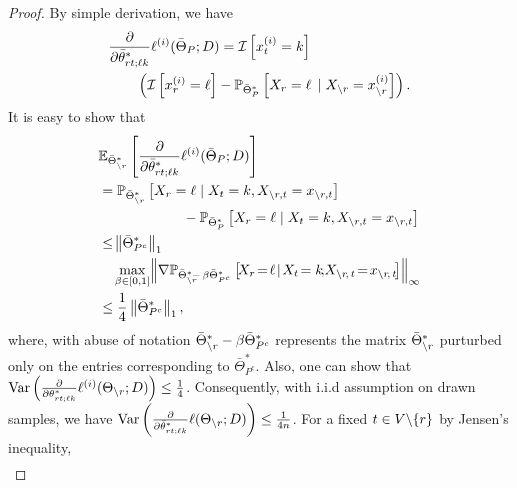 \begin{proof}
By simple derivation, we have
\begin{equation}
\begin{aligned}
&\frac{\partial}{\partial\bar{\theta}^*_{r t;\ell k}}\ell^{(i)}(\bar{\Theta}_P; D) = \mathcal{I}\left[x_t^{(i)}=k\right] \\ &\qquad\left(\mathcal{I}\left[x_{r}^{(i)}=\ell\right] - \mathbb{P}_{\bar{\Theta}^*_P} \left[X_{r} = \ell \, \mid X_{\backslash r} =
x_{\backslash r}^{(i)}\right]\right).
\end{aligned}
\nonumber
\end{equation}
It is easy to show that
\begin{equation} 
\begin{aligned}
&\mathbb{E}_{\bar{\Theta}^*_{\backslash\svert}}\left[\frac{\partial}{\partial\bar{\theta}^*_{\svert t;\ell k}}\ell^{(i)}(\bar{\Theta}_P; \Data)\right]\\ &=\mathbb{P}_{\bar{\Theta}^*_{\backslash\svert}}\left[X_\svert=\ell\mid X_t=k,X_{\backslash\svert,t}=x_{\backslash\svert,t}\right]\\ &\qquad\qquad\qquad-\mathbb{P}_{\bar{\Theta}^*_P}\left[X_\svert=\ell\mid X_t=k,X_{\backslash\svert,t}=x_{\backslash\svert,t}\right]\\
&\leq\!\norm{\bar{\Theta}^*_{P^c}}{1}\\ &\quad\max_{\beta\in[0,1]}\!\norm{\nabla\mathbb{P}_{\bar{\Theta}^*_{\backslash\svert}\!\!\!-\,\beta\bar{\Theta}^*_{P^c}} \left[\!X_\svert\!=\!\ell\!\mid\! X_t\!=k\!,\!X_{\backslash\svert\!,\,t}\!=\!x_{\backslash\svert\!,\,t}\!\right]}{\infty}\\ &\leq\frac{1}{4}\norm{\bar{\Theta}^*_{P^c}}{1},
\end{aligned}
\nonumber
\end{equation}
where, with abuse of notation $\bar{\Theta}^*_{\backslash r}-\beta\bar{\Theta}^*_{P^c}$ represents the matrix $\bar{\Theta}^*_{\backslash r}$ purturbed only on the entries corresponding to $\bar{\Theta}^*_{P^c}$. Also, one can show that $\text{Var}\left(\frac{\partial}{\partial\theta^*_{r t;\ell k}}\ell^{(i)}(\Theta_{\backslash r}; D)\right)\leq\frac{1}{4}$. Consequently, with i.i.d assumption on drawn samples, we have $\text{Var}\left(\frac{\partial}{\partial\bar{\theta}^*_{rt;\ell k}}\ell(\Theta_{\backslash r}; D)\right)\leq\frac{1}{4n}$. For a fixed $t\in V\backslash\{r\}$ by Jensen's inequality,
\begin{equation}
\begin{aligned}

\end{aligned}
\end{equation}
\end{proof}
